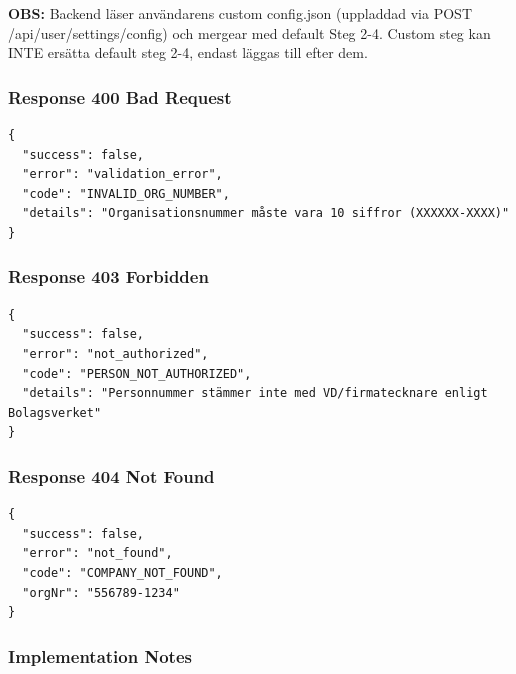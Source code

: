 \documentclass[12pt,a4paper]{article}
\begin{document}
\textbf{OBS:} Backend läser användarens custom config.json (uppladdad via POST /api/user/settings/config) och mergear med default Steg 2-4. Custom steg kan INTE ersätta default steg 2-4, endast läggas till efter dem.

\subsubsection{Response 400 Bad Request}

\begin{lstlisting}
{
  "success": false,
  "error": "validation_error",
  "code": "INVALID_ORG_NUMBER",
  "details": "Organisationsnummer måste vara 10 siffror (XXXXXX-XXXX)"
}
\end{lstlisting}

\subsubsection{Response 403 Forbidden}

\begin{lstlisting}
{
  "success": false,
  "error": "not_authorized",
  "code": "PERSON_NOT_AUTHORIZED",
  "details": "Personnummer stämmer inte med VD/firmatecknare enligt Bolagsverket"
}
\end{lstlisting}

\subsubsection{Response 404 Not Found}
\begin{lstlisting}
{
  "success": false,
  "error": "not_found",
  "code": "COMPANY_NOT_FOUND",
  "orgNr": "556789-1234"
}
\end{lstlisting}

\subsubsection{Implementation Notes}
\end{document}
